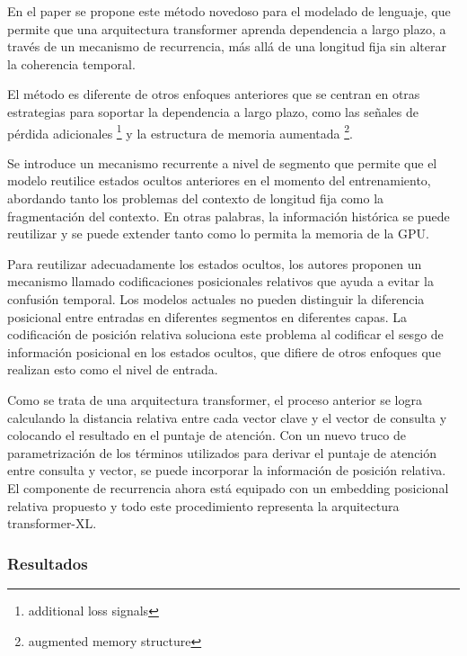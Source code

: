 \documentclass[conference]{IEEEtran}
\begin{document}
\vspace{0.2cm}

En el paper \cite{b30} se propone este m\'etodo novedoso para el modelado de lenguaje, que permite que una arquitectura transformer aprenda dependencia a largo plazo, a trav\'es de un mecanismo de recurrencia, m\'as all\'a de una longitud fija sin alterar la coherencia temporal.

\vspace{0.2cm}

El m\'etodo es diferente de otros enfoques anteriores que se centran en otras estrategias para soportar la dependencia a largo plazo, como las se\~nales de p\'erdida adicionales \footnote{additional loss signals} y la estructura de memoria aumentada \footnote{augmented memory structure}.

Se introduce un mecanismo recurrente a nivel de segmento que permite que el modelo reutilice estados ocultos anteriores en el momento del entrenamiento, abordando tanto los problemas del contexto de longitud fija como la fragmentaci\'on del contexto. En otras palabras, la información hist\'orica se puede reutilizar y se puede extender tanto como lo permita la memoria de la GPU.


\vspace{0.2cm}

Para reutilizar adecuadamente los estados ocultos, los autores proponen un mecanismo llamado codificaciones posicionales relativos que ayuda a evitar la confusi\'on temporal. Los modelos actuales no pueden distinguir la diferencia posicional entre entradas en diferentes segmentos en diferentes capas. La codificaci\'on de posici\'on relativa soluciona este problema al codificar el sesgo de informaci\'on posicional en los estados ocultos, que difiere de otros enfoques que realizan esto como el nivel de entrada.

Como se trata de una arquitectura transformer, el proceso anterior se logra calculando la distancia relativa entre cada vector clave y el vector de consulta y colocando el resultado  en el puntaje de atenci\'on. Con un nuevo truco de parametrizaci\'on de los t\'erminos utilizados para derivar el puntaje de atenci\'on entre consulta y vector, se puede incorporar la informaci\'on de posici\'on relativa. El componente de recurrencia ahora est\'a equipado con un embedding posicional relativa propuesto y todo este procedimiento representa la arquitectura transformer-XL.

\subsubsection{Resultados}
\end{document}
